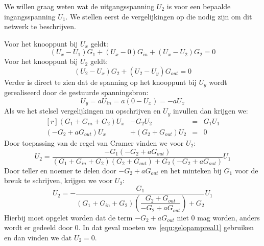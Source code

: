 \begin{example}
We willen graag weten wat de uitgangsspanning $U_2$ is voor een bepaalde ingangsspanning $U_1$. We stellen eerst de vergelijkingen op die nodig zijn om dit netwerk te beschrijven.

Voor het knooppunt bij $U_x$ geldt:
%
\begin{equation}
(U_x-U_1)G_1 + (U_x-0)G_{in} + (U_x-U_2)G_2 = 0
\end{equation}
%
Voor het knooppunt bij $U_2$ geldt:
%
\begin{equation}
(U_2-U_x)G_2 + (U_2-U_y)G_{out} = 0
\end{equation}
%
Verder is direct te zien dat de spanning op het knooppunt bij $U_y$ wordt gerealiseerd door de gestuurde spanningsbron:
%
\begin{equation}
U_y = aU_{in} = a(0-U_x) = -aU_x
\end{equation}
%
Als we het stelsel vergelijkingen nu opschrijven en $U_y$ invullen dan krijgen we:
%
\begin{equation}
\begin{matrix*}[r]
\label{equ:gelopampa}
(G_1+G_{in}+G_2)U_x &- G_2U_2 &=& G_1U_1 \\
(-G_2+aG_{out})U_x & + (G_2+G_{out})U_2 &=& 0
\end{matrix*}
\end{equation}
%
Door toepassing van de regel van Cramer vinden we voor $U_2$:
%
\begin{equation}
\label{equ:gelopampreal1}
U_2 = \dfrac{-G_1(-G_2+aG_{out})}{(G_1+G_{in}+G_2)(G_2+G_{out}) + G_2(-G_2+aG_{out})}U_1
\end{equation}
%
Door teller en noemer te delen door $-G_2+aG_{out}$ en het minteken bij $G_1$ voor de breuk te schrijven, krijgen we voor $U_2$:
%
\begin{equation}
\label{equ:gelopampreal2}
U_2 = -\dfrac{G_1}{(G_1+G_{in}+G_2)\left(\dfrac{G_2+G_{out}}{-G_2+aG_{out}}\right)+G_2}U_1
\end{equation}
%
Hierbij moet opgelet worden dat de term $-G_2+aG_{out}$ niet 0 mag worden, anders wordt er gedeeld door 0. In dat geval moeten we~\eqref{equ:gelopampreal1} gebruiken en dan vinden we dat $U_2=0$.


\end{example}
